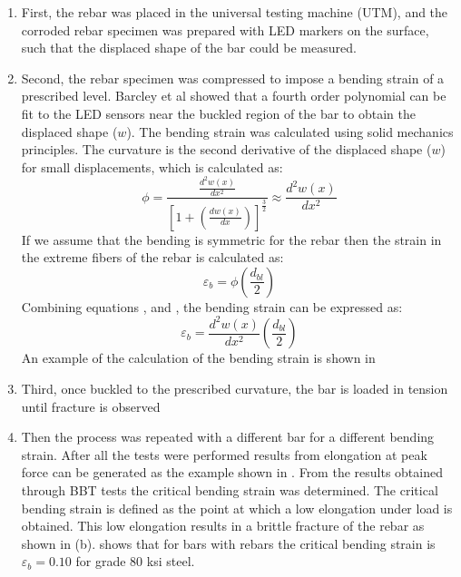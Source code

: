 \begin{enumerate}
    \item First, the rebar was placed in the universal testing machine (UTM), and the corroded rebar specimen was prepared with LED markers on the surface, such that the displaced shape of the bar could be measured.
    \item Second, the rebar specimen was compressed to impose a bending strain of a prescribed level. Barcley et al showed that a fourth order polynomial can be fit to the LED sensors near the buckled region of the bar to obtain the displaced shape ($w$). The bending strain was calculated using solid mechanics principles. The curvature is the second derivative of the displaced shape ($w$) for small displacements, which is calculated as: 
    \begin{equation}
        \phi=\frac{\frac{d^2w(x)}{dx^2}}{\left[1+\left(\frac{dw(x)}{dx}\right)\right]^\frac{3}{2}}\approx \frac{d^2w(x)}{dx^2}
        \label{eq.CuvatureAprox}
    \end{equation}
    If we assume that the bending is symmetric for the rebar then the strain in the extreme fibers of the rebar is calculated as:
    \begin{equation}
        \varepsilon_{b}=\phi\left(\frac{d_{bl}}{2}\right) 
        \label{eq.BendingStrain}
    \end{equation}    
    Combining equations , and , the bending strain can be expressed as:
    \begin{equation}
        \varepsilon_{b}=\frac{d^2w(x)}{dx^2}\left(\frac{d_{bl}}{2}\right) 
        \label{eq.BendingStrainExpanded}
    \end{equation}
    An example of the calculation of the bending strain is shown in 
    \item Third, once buckled to the prescribed curvature, the bar is loaded in tension until fracture is observed
    \item Then the process was repeated with a different bar for a different bending strain. After all the tests were performed results from elongation at peak force can be generated as the example shown in . From the results obtained through BBT tests the critical bending strain was determined. The critical bending strain is defined as the point at which a low elongation under load is obtained. This low elongation results in a brittle fracture of the rebar as shown in (b).  shows that for bars with rebars the critical bending strain is $\varepsilon_{b}=0.10$ for grade 80 ksi steel.
\end{enumerate}

